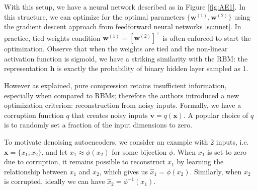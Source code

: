 With this setup, we have a neural network described as in Figure \ref{fig:AE1}.
In this structure, we can optimize for the optimal parameters 
$\{\mathbf{w}^{(1)}, \mathbf{w}^{(2)}\}$ using the gradient descent approach
from feedforward neural networks \ref{sc:nnet}. 
In practice, tied weights condition
$\mathbf{w}^{(1)} = [\mathbf{w}^{(2)}]^\top$ 
is often enforced to start the optimization.
Observe that when the weights are tied and 
the non-linear activation function is sigmoid, 
we have a striking similarity with the RBM:
the representation $\mathbf{h}$ is exactly 
the probability of binary hidden layer sampled as 1.

However as \cite{VLLBM10} explained, 
pure compression retains insufficient information,
especially when compared to RBMs;
therefore the authors introduced a new optimization criterion:
reconstruction from noisy inputs.
Formally, we have a corruption function $q$ 
that creates noisy inputs $\mathbf{v} = q(\mathbf{x})$.
A popular choice of $q$ is to randomly 
set a fraction of the input dimensions to zero.

To motivate denoising autoencoders, 
we consider an example with 2 inputs, i.e. $\mathbf{x} = \{x_1, x_2\}$,
and let $x_1 \approx \phi(x_2)$ for some bijection $\phi$.
When $x_1$ is set to zero due to corruption, 
it remains possible to reconstruct $x_1$ by 
learning the relationship between $x_1$ and $x_2$,
which gives us $\hat{x}_1 = \phi(x_2)$.
Similarly, when $x_2$ is corrupted, ideally we can have 
$\hat{x}_2 = \phi^{-1}(x_1)$.


